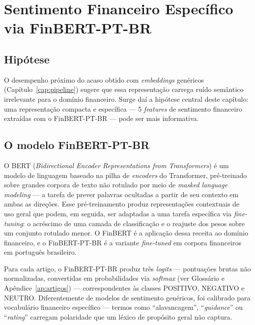 \chapter{Sentimento Financeiro Específico via FinBERT-PT-BR}\label{cap:sentimento}

\section{Hipótese}

O desempenho próximo do acaso obtido com \textit{embeddings} genéricos (Capítulo~\ref{cap:pipeline}) sugere que essa representação carrega ruído semântico irrelevante para o domínio financeiro. Surge daí a hipótese central deste capítulo: uma representação compacta e específica --- 5 \textit{features} de sentimento financeiro extraídas com o FinBERT-PT-BR \cite{souza2023} --- pode ser mais informativa.

\section{O modelo FinBERT-PT-BR}

O BERT (\textit{Bidirectional Encoder Representations from Transformers}) \cite{devlin2019} é um modelo de linguagem baseado na pilha de \textit{encoders} do Transformer, pré-treinado sobre grandes corpora de texto não rotulado por meio de \textit{masked language modeling} --- a tarefa de prever palavras ocultadas a partir de seu contexto em ambas as direções. Esse pré-treinamento produz representações contextuais de uso geral que podem, em seguida, ser adaptadas a uma tarefa específica via \textit{fine-tuning}: o acréscimo de uma camada de classificação e o reajuste dos pesos sobre um conjunto rotulado menor. O FinBERT \cite{araci2019} é a aplicação dessa receita ao domínio financeiro, e o FinBERT-PT-BR \cite{souza2023} é a variante \textit{fine-tuned} em corpora financeiros em português brasileiro.

Para cada artigo, o FinBERT-PT-BR produz três \textit{logits} --- pontuações brutas não normalizadas, convertidas em probabilidades via \textit{softmax} (ver Glossário e Apêndice~\ref{ap:artigos}) --- correspondentes às classes POSITIVO, NEGATIVO e NEUTRO. Diferentemente de modelos de sentimento genéricos, foi calibrado para vocabulário financeiro específico --- termos como ``alavancagem'', ``\textit{guidance}'' ou ``\textit{rating}'' carregam polaridade que um léxico de propósito geral não captura.


